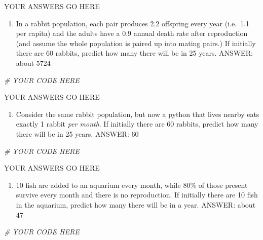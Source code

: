 \documentclass[
]{book}
\newenvironment{Shaded}{\begin{snugshade}}{\end{snugshade}}
\newcommand{\CommentTok}[1]{\textcolor[rgb]{0.56,0.35,0.01}{\textit{#1}}}
\providecommand{\tightlist}{%
  \setlength{\itemsep}{0pt}\setlength{\parskip}{0pt}}
\theoremstyle{definition}
\theoremstyle{definition}
\theoremstyle{definition}
\theoremstyle{remark}
\begin{document}
YOUR ANSWERS GO HERE

\begin{enumerate}
\def\labelenumi{\arabic{enumi}.}
\setcounter{enumi}{2}
\tightlist
\item
  In a rabbit population, each pair produces 2.2 offspring every year (i.e.~1.1 per capita) and the adults have a 0.9 annual death rate after reproduction (and assume the whole population is paired up into mating pairs.) If initially there are 60 rabbits, predict how many there will be in 25 years. ANSWER: about 5724
\end{enumerate}

\begin{Shaded}
\begin{Highlighting}[]
\CommentTok{\# YOUR CODE HERE}
\end{Highlighting}
\end{Shaded}

YOUR ANSWERS GO HERE

\begin{enumerate}
\def\labelenumi{\arabic{enumi}.}
\setcounter{enumi}{3}
\tightlist
\item
  Consider the same rabbit population, but now a python that lives nearby eats exactly 1 rabbit \emph{per month}. If initially there are 60 rabbits, predict how many there will be in 25 years. ANSWER: 60
\end{enumerate}

\begin{Shaded}
\begin{Highlighting}[]
\CommentTok{\# YOUR CODE HERE}
\end{Highlighting}
\end{Shaded}

YOUR ANSWERS GO HERE

\begin{enumerate}
\def\labelenumi{\arabic{enumi}.}
\setcounter{enumi}{4}
\tightlist
\item
  10 fish are added to an aquarium every month, while 80\% of those present survive every month and there is no reproduction. If initially there are 10 fish in the aquarium, predict how many there will be in a year. ANSWER: about 47
\end{enumerate}

\begin{Shaded}
\begin{Highlighting}[]
\CommentTok{\# YOUR CODE HERE}
\end{Highlighting}
\end{Shaded}
\end{document}
